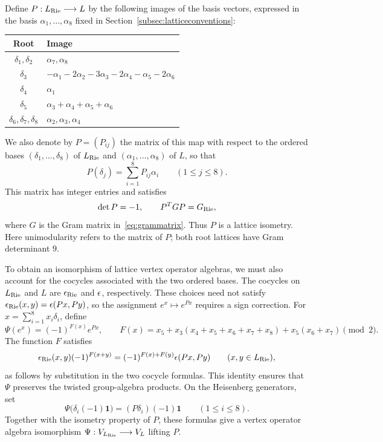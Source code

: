\documentclass[11pt,reqno]{amsart}
\theoremstyle{definition}\newtheorem{definition}[theorem]{Definition}
\theoremstyle{remark}\newtheorem{remark}[theorem]{Remark}
\newcommand{\one}{\mathbf1}\newcommand{\slc}{\mathfrak{sl}_2}
\numberwithin{equation}{section}
\begin{document}
Define $P:L_{\rm Rie}\longrightarrow L$ by the following images of the basis vectors, expressed in the basis $\alpha_1,\ldots,\alpha_8$ fixed in Section~\ref{subsec:latticeconventions}:
\begin{center}\small
\begin{tabular}{cl}\toprule
Root & Image\\\midrule
$\delta_1,\delta_2$ & $\alpha_7,\alpha_8$\\
$\delta_3$ & $-\alpha_1-2\alpha_2-3\alpha_3-2\alpha_4-\alpha_5-2\alpha_6$\\
$\delta_4$ & $\alpha_1$\\
$\delta_5$ & $\alpha_3+\alpha_4+\alpha_5+\alpha_6$\\
$\delta_6,\delta_7,\delta_8$ & $\alpha_2,\alpha_3,\alpha_4$\\\bottomrule
\end{tabular}
\end{center}
We also denote by $P=(P_{ij})$ the matrix of this map with respect to the ordered bases $(\delta_1,\ldots,\delta_8)$ of $L_{\rm Rie}$ and $(\alpha_1,\ldots,\alpha_8)$ of $L$, so that
\[
 P(\delta_j)=\sum_{i=1}^{8}P_{ij}\alpha_i
 \qquad(1\le j\le8).
\]
This matrix has integer entries and satisfies
\[
 \det P=-1,\qquad P^TGP=G_{\rm Rie},
\]
where $G$ is the Gram matrix in~\eqref{eq:grammatrix}. Thus $P$ is a lattice isometry. Here unimodularity refers to the matrix of $P$; both root lattices have Gram determinant $9$.

To obtain an isomorphism of lattice vertex operator algebras, we must also account for the cocycles associated with the two ordered bases. The cocycles on $L_{\rm Rie}$ and $L$ are $\epsilon_{\rm Rie}$ and $\epsilon$, respectively. These choices need not satisfy $\epsilon_{\rm Rie}(x,y)=\epsilon(Px,Py)$, so the assignment $e^x\mapsto e^{Px}$ requires a sign correction. For $x=\sum_{i=1}^8x_i\delta_i$, define
\begin{equation}\label{eq:Rlift}
 \Psi(e^x)=(-1)^{F(x)}e^{Px},\qquad
 F(x)=x_5+x_3(x_4+x_5+x_6+x_7+x_8)+x_5(x_6+x_7)\pmod2.
\end{equation}
The function $F$ satisfies
\[
 \epsilon_{\rm Rie}(x,y)(-1)^{F(x+y)}
 =(-1)^{F(x)+F(y)}\epsilon(Px,Py)
 \qquad(x,y\in L_{\rm Rie}),
\]
as follows by substitution in the two cocycle formulas. This identity ensures that $\Psi$ preserves the twisted group-algebra products. On the Heisenberg generators, set
\[
 \Psi\bigl(\delta_i(-1)\one\bigr)=(P\delta_i)(-1)\one
 \qquad(1\le i\le8).
\]
Together with the isometry property of $P$, these formulas give a vertex operator algebra isomorphism $\Psi:V_{L_{\rm Rie}}\longrightarrow V_L$ lifting $P$.
\end{document}
